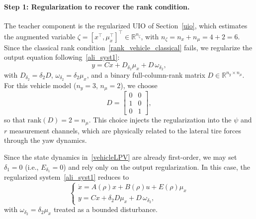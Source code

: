\paragraph{Step 1: Regularization to recover the rank condition.}
The teacher component is the regularized UIO of Section~\ref{uio}, which estimates the augmented variable $\zeta=[x^\top,\mu_x^\top]^\top \in \mathbb{R}^{n_\zeta}$, with $n_\zeta = n_x + n_\mu = 4 + 2 = 6$. Since the classical rank condition~\eqref{rank_vehicle_classical} fails, we regularize the output equation following~\eqref{ali_syst1}:
\begin{equation}\label{eq:vehicle_regularized_output}
    y = Cx + D_{\delta_2}\mu_x + D\,\omega_{\delta_2},
\end{equation}
with $D_{\delta_2}=\delta_2 D$, $\omega_{\delta_2}=\delta_2\mu_x$, and a binary full-column-rank matrix $D\in\mathbb{R}^{n_y\times n_\mu}$. For this vehicle model ($n_y=3$, $n_\mu=2$), we choose
\begin{equation}\label{eq:vehicle_D_choice}
    D=\begin{bmatrix}0&0\\1&0\\0&1\end{bmatrix},
\end{equation}
so that $\mathrm{rank}(D)=2=n_\mu$. This choice injects the regularization into the $\psi$ and $r$ measurement channels, which are physically related to the lateral tire forces through the yaw dynamics.

Since the state dynamics in~\eqref{vehicleLPV} are already first-order, we may set $\delta_1=0$ (i.e., $E_{\delta_1}=0$) and rely only on the output regularization. In this case, the regularized system~\eqref{ali_syst1} reduces to
\begin{equation}\label{eq:vehicle_regularized_system}
    \begin{cases}
        \dot{x} = A(\rho)x + B(\rho)u + E(\rho)\mu_x \\
        y = Cx + \delta_2 D \mu_x + D\,\omega_{\delta_2},
    \end{cases}
\end{equation}
with $\omega_{\delta_2} = \delta_2\mu_x$ treated as a bounded disturbance.

